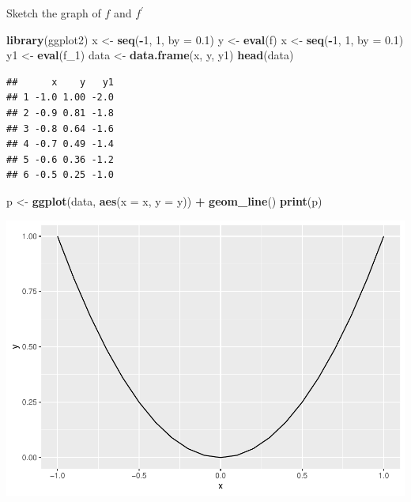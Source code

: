 \documentclass[]{book}
\newenvironment{Shaded}{\begin{snugshade}}{\end{snugshade}}
\newcommand{\DataTypeTok}[1]{\textcolor[rgb]{0.13,0.29,0.53}{#1}}
\newcommand{\DecValTok}[1]{\textcolor[rgb]{0.00,0.00,0.81}{#1}}
\newcommand{\FloatTok}[1]{\textcolor[rgb]{0.00,0.00,0.81}{#1}}
\newcommand{\KeywordTok}[1]{\textcolor[rgb]{0.13,0.29,0.53}{\textbf{#1}}}
\newcommand{\NormalTok}[1]{#1}
\newcommand{\OperatorTok}[1]{\textcolor[rgb]{0.81,0.36,0.00}{\textbf{#1}}}
\newcommand{\StringTok}[1]{\textcolor[rgb]{0.31,0.60,0.02}{#1}}
\begin{document}
Sketch the graph of \(f\) and \(f^\prime\)

\begin{Shaded}
\begin{Highlighting}[]
\KeywordTok{library}\NormalTok{(ggplot2)}
\NormalTok{x <-}\StringTok{ }\KeywordTok{seq}\NormalTok{(}\OperatorTok{-}\DecValTok{1}\NormalTok{, }\DecValTok{1}\NormalTok{, }\DataTypeTok{by =} \FloatTok{0.1}\NormalTok{)}
\NormalTok{y <-}\StringTok{ }\KeywordTok{eval}\NormalTok{(f)}
\NormalTok{x <-}\StringTok{ }\KeywordTok{seq}\NormalTok{(}\OperatorTok{-}\DecValTok{1}\NormalTok{, }\DecValTok{1}\NormalTok{, }\DataTypeTok{by =} \FloatTok{0.1}\NormalTok{)}
\NormalTok{y1 <-}\StringTok{ }\KeywordTok{eval}\NormalTok{(f_}\DecValTok{1}\NormalTok{)}
\NormalTok{data <-}\StringTok{ }\KeywordTok{data.frame}\NormalTok{(x, y, y1)}
\KeywordTok{head}\NormalTok{(data)}
\end{Highlighting}
\end{Shaded}

\begin{verbatim}
##      x    y   y1
## 1 -1.0 1.00 -2.0
## 2 -0.9 0.81 -1.8
## 3 -0.8 0.64 -1.6
## 4 -0.7 0.49 -1.4
## 5 -0.6 0.36 -1.2
## 6 -0.5 0.25 -1.0
\end{verbatim}

\begin{Shaded}
\begin{Highlighting}[]
\NormalTok{p <-}\StringTok{ }\KeywordTok{ggplot}\NormalTok{(data, }\KeywordTok{aes}\NormalTok{(}\DataTypeTok{x =}\NormalTok{ x, }\DataTypeTok{y =}\NormalTok{ y)) }\OperatorTok{+}
\StringTok{  }\KeywordTok{geom_line}\NormalTok{()}
\KeywordTok{print}\NormalTok{(p)}
\end{Highlighting}
\end{Shaded}

\includegraphics{bookdown-demo_files/figure-latex/unnamed-chunk-7-1.pdf}
\end{document}
